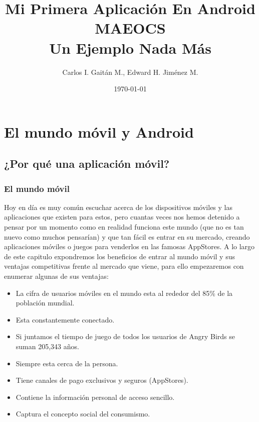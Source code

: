 \documentclass[11pt]{book}
\title{\bf Mi Primera Aplicación En Android\\ MAEOCS\\ Un Ejemplo Nada Más}    %
\author{Carlos I. Gaitán M., Edward H. Jiménez M.}              %
\date{\today}                           %
\begin{document}
                        
\frontmatter                            %
\maketitle                              %
\tableofcontents                        %
\mainmatter                             %



\part{El mundo móvil y Android}  
    
\chapter{¿Por qué una aplicación móvil?}

\newpage
\section{El mundo móvil}              	
Hoy en día es muy común escuchar acerca de los dispositivos móviles y las aplicaciones que existen para estos, pero cuantas veces nos hemos detenido a pensar por un momento como en realidad funciona este mundo (que no es tan nuevo como muchos pensarían) y que tan fácil es entrar en su mercado, creando aplicaciones móviles o juegos para venderlos en las famosas \gls{AppStores}. A lo largo de este capitulo expondremos los beneficios de entrar al mundo móvil y sus ventajas competitivas frente al mercado que viene, para ello empezaremos con enumerar algunas de sus ventajas:

\begin{itemize}
\item La cifra de usuarios móviles en el mundo esta al rededor del 85\% de la población mundial.
\item Esta constantemente conectado.
\item Si juntamos el tiempo de juego de todos los usuarios de \gls{Angry Birds} se suman 205,343 años.
\item Siempre esta cerca de la persona.
\item Tiene canales de pago exclusivos y seguros (\gls{AppStores}).
\item Contiene la información personal de acceso sencillo.
\item Captura el concepto social del consumismo.
\end{itemize}
\end{document}
